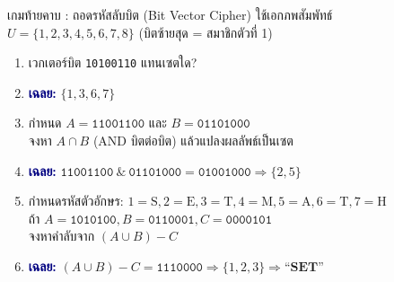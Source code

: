 \begin{frame}{เกมท้ายคาบ : ถอดรหัสลับบิต (Bit Vector Cipher)}
  ใช้เอกภพสัมพัทธ์ $U = \{1, 2, 3, 4, 5, 6, 7, 8\}$ (บิตซ้ายสุด = สมาชิกตัวที่ 1)
  \begin{enumerate}
    \item[\textbf{รอบ 1}] เวกเตอร์บิต \texttt{10100110} แทนเซตใด? 
    \pause
    \item[] \hfill \textcolor{navy}{\textbf{เฉลย:}} $\{1, 3, 6, 7\}$
    \pause
    \item[\textbf{รอบ 2}] กำหนด $A = \texttt{11001100}$ และ $B = \texttt{01101000}$ \\
          จงหา $A \cap B$ (AND บิตต่อบิต) แล้วแปลงผลลัพธ์เป็นเซต 
    \pause
    \item[] \hfill \textcolor{navy}{\textbf{เฉลย:}} $\texttt{11001100} \ \& \ \texttt{01101000} = \texttt{01001000} \Rightarrow \{2, 5\}$
    \pause
    \item[\textbf{รอบ 3}] กำหนดรหัสตัวอักษร: $1{=}\text{S}, 2{=}\text{E}, 3{=}\text{T}, 4{=}\text{M}, 5{=}\text{A}, 6{=}\text{T}, 7{=}\text{H}$ \\
          ถ้า $A = \texttt{1010100}, B = \texttt{0110001}, C = \texttt{0000101}$ \\
          จงหาคำลับจาก $(A \cup B) - C$ 
    \pause
    \item[] \hfill \textcolor{navy}{\textbf{เฉลย:}} $(A \cup B) - C = \texttt{1110000} \Rightarrow \{1, 2, 3\} \Rightarrow \mathbf{\text{``SET''}}$
  \end{enumerate}
\end{frame}


